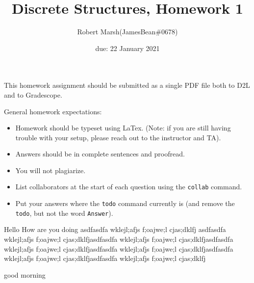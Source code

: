 \documentclass{article}
\title{Discrete Structures, Homework 1}
\author{Robert Marsh(JamesBean\#0678)}
\date{due: 22 January 2021}
\begin{document}
\maketitle

This homework assignment should be
submitted as a single PDF file both to D2L and to Gradescope.

General homework expectations:
\begin{itemize}
    \item Homework should be typeset using LaTex.  (Note: if you are still
        having trouble with your setup, please reach out to the instructor and
        TA).
    \item Answers should be in complete sentences and proofread.
    \item You will not plagiarize.
    \item List collaborators at the start of each question using the
        \texttt{collab} command.
    \item Put your answers where the \texttt{todo} command currently is (and
        remove the \texttt{todo}, but not the word \texttt{Answer}).
\end{itemize}

\clearpage

\setlength{\parindent}{10ex}
\par

Hello How are you doing asdfasdfa wklejl;afjs f;oajwe;l cjas;dklfj asdfasdfa wklejl;afjs f;oajwe;l cjas;dklfjasdfasdfa wklejl;afjs f;oajwe;l cjas;dklfjasdfasdfa wklejl;afjs f;oajwe;l cjas;dklfjasdfasdfa wklejl;afjs f;oajwe;l cjas;dklfjasdfasdfa wklejl;afjs f;oajwe;l cjas;dklfjasdfasdfa wklejl;afjs f;oajwe;l cjas;dklfj

\par

good morning
\end{document}
